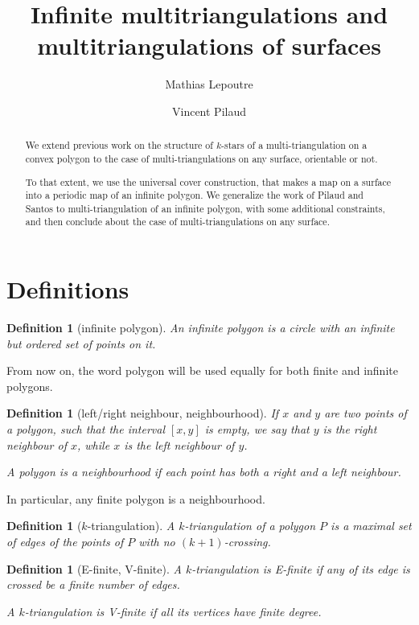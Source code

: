 \documentclass{amsart}
\title{Infinite multitriangulations and multitriangulations of surfaces}
\author{Mathias Lepoutre}
\author{Vincent Pilaud}
\newtheorem{definition}[theorem]{Definition}
\theoremstyle{remark}
\newcommand{\darkblue}{\color{darkblue}} %
\newcommand{\defn}[1]{\textsl{\darkblue #1}} %
\newcommand*{\nbd}[0]{neighbourhood\xspace}
\newcommand*{\ef}[0]{E-finite\xspace}
\newcommand*{\vf}[0]{V-finite\xspace}
\begin{document}
\begin{abstract}
We extend previous work on the structure of $k$-stars of a multi-triangulation on a convex polygon to the case of multi-triangulations on any surface, orientable or not. 

To that extent, we use the universal cover construction, that makes a map on a surface into a periodic map of an infinite polygon. We generalize the work of Pilaud and Santos to multi-triangulation of an infinite polygon, with some additional constraints, and then conclude about the case of multi-triangulations on any surface.
\end{abstract}

\maketitle

\section{Definitions}


\begin{definition}[infinite polygon]
An \defn{infinite polygon} is a circle with an infinite but ordered set of points on it.
\end{definition}

From now on, the word polygon will be used equally for both finite and infinite polygons.

\begin{definition}[left/right neighbour, \nbd]
If $x$ and $y$ are two points of a polygon, such that the interval $[x,y]$ is empty, we say that $y$ is the \defn{right neighbour} of $x$, while $x$ is the \defn{left neighbour} of $y$.

A polygon is a \nbd if each point has both a right and a left neighbour.
\end{definition}

In particular, any finite polygon is a \nbd.

\begin{definition}[$k$-triangulation]
A $k$-triangulation of a polygon $P$ is a maximal set of edges of the points of $P$ with no $(k+1)$-crossing.
\end{definition}

\begin{definition}[\ef, \vf]
A $k$-triangulation is \ef if any of its edge is crossed be a finite number of edges.

A $k$-triangulation is \vf if all its vertices have finite degree.
\end{definition}
\end{document}
